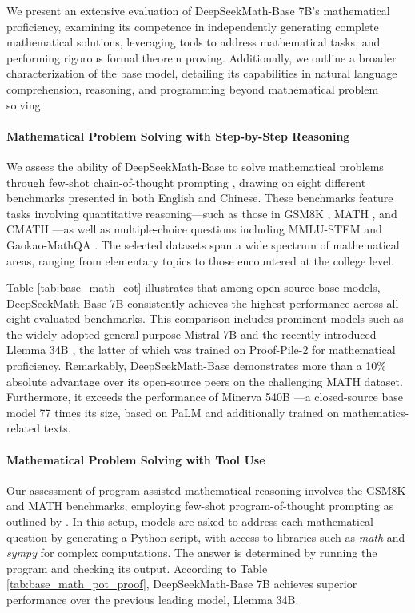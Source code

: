 \begin{itemize}[topsep=0pt]
We present an extensive evaluation of DeepSeekMath-Base 7B's mathematical proficiency, examining its competence in independently generating complete mathematical solutions, leveraging tools to address mathematical tasks, and performing rigorous formal theorem proving. Additionally, we outline a broader characterization of the base model, detailing its capabilities in natural language comprehension, reasoning, and programming beyond mathematical problem solving.

\paragraph{Mathematical Problem Solving with Step-by-Step Reasoning}

We assess the ability of DeepSeekMath-Base to solve mathematical problems through few-shot chain-of-thought prompting \citep{cot}, drawing on eight different benchmarks presented in both English and Chinese. These benchmarks feature tasks involving quantitative reasoning—such as those in GSM8K \citep{gsm8k}, MATH \citep{MATH}, and CMATH \citep{wei2023cmath}—as well as multiple-choice questions including MMLU-STEM \citep{mmlu} and Gaokao-MathQA \citep{agieval}. The selected datasets span a wide spectrum of mathematical areas, ranging from elementary topics to those encountered at the college level.

Table \ref{tab:base_math_cot} illustrates that among open-source base models, DeepSeekMath-Base 7B consistently achieves the highest performance across all eight evaluated benchmarks. This comparison includes prominent models such as the widely adopted general-purpose Mistral 7B \citep{mistral} and the recently introduced Llemma 34B \citep{llemma}, the latter of which was trained on Proof-Pile-2 \citep{llemma} for mathematical proficiency. Remarkably, DeepSeekMath-Base demonstrates more than a 10\% absolute advantage over its open-source peers on the challenging MATH dataset. Furthermore, it exceeds the performance of Minerva 540B \citep{minerva}—a closed-source base model 77 times its size, based on PaLM \citep{palm} and additionally trained on mathematics-related texts.

\paragraph{Mathematical Problem Solving with Tool Use} Our assessment of program-assisted mathematical reasoning involves the GSM8K and MATH benchmarks, employing few-shot program-of-thought prompting as outlined by \citep{pot,pal}. In this setup, models are asked to address each mathematical question by generating a Python script, with access to libraries such as \textit{math} and \textit{sympy} for complex computations. The answer is determined by running the program and checking its output. According to Table \ref{tab:base_math_pot_proof}, DeepSeekMath-Base 7B achieves superior performance over the previous leading model, Llemma 34B.


\end{itemize}
